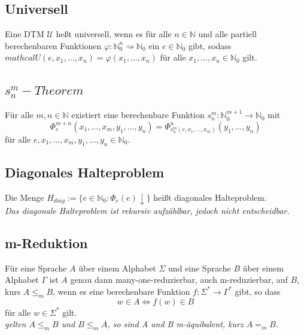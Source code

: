 \documentclass[DIV=15]{scrartcl}
\begin{document}
    \subsection{Universell}
        Eine DTM \(\mathcal{U}\) heßt universell, wenn es für alle \(n\in\mathbb{N}\) und alle partiell berechenbaren Funktionen \(\varphi:\mathbb{N}_0^n\rightsquigarrow\mathbb{N}_0\) 
        ein \(e\in\mathbb{N}_0\) gibt, sodass \(mathcal{U}(e,x_1,\dots,x_n)=\varphi(x_1,\dots,x_n)\) für alle \(x_1,\dots,x_n\in\mathbb{N}_0\) gilt.
    \subsection{\(s_n^m-Theorem\)}
        Für alle \(m,n\in\mathbb{N}\) existiert eine berechenbare Funktion \(s_n^m:\mathbb{N}_0^{m+1}\to\mathbb{N}_0\) mit 
        \[\Phi_e^{m+n}(x_1,\dots,x_m,y_1,\dots,y_n)=\Phi^n_{s_n^m(e,x_1,\dots,x_m)}(y_1,\dots,y_n)\]
        für alle \(e,x_1,\dots,x_m,y_1,\dots,y_n\in\mathbb{N}_0\).
    \subsection{Diagonales Halteproblem}
        Die Menge \(H_{diag}:=\{e\in\mathbb{N}_0:\Phi_e(e)\downarrow\}\) heißt diagonales Halteproblem.\\
        \textit{Das diagonale Halteproblem ist rekursiv aufzählbar, jedoch nicht entscheidbar.}
    \subsection{m-Reduktion}
        Für eine Sprache \(A\) über einem Alphabet \(\Sigma\) und eine Sprache \(B\) über einem Alphabet \(\Gamma\)
        ist \(A\) genau dann many-one-reduzierbar, auch m-reduzierbar, auf \(B\), kurs \(A\leq_m B\), wenn es eine berechenbare Funktion 
        \(f:\Sigma^*\to\Gamma^*\) gibt, so dass
        \[w\in A\Leftrightarrow f(w)\in B\]
        für alle \(w\in\Sigma^*\) gilt.\\
        \textit{gelten \(A\leq_m B\) und \(B\leq_m A\), so sind A und B m-äquibalent, kurz \(A=_m B\).}
\end{document}

